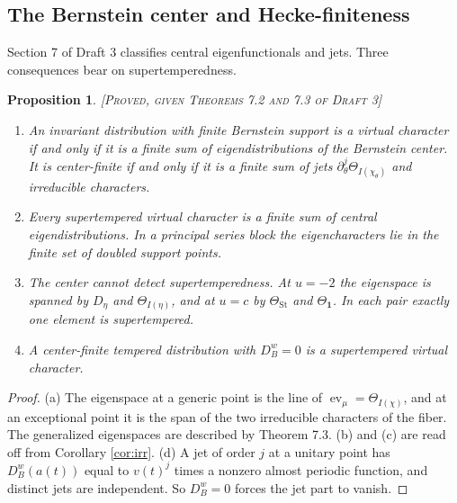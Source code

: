 \documentclass[12pt,letterpaper]{amsart}
\numberwithin{equation}{section}
\newtheorem{proposition}[theorem]{Proposition}
\theoremstyle{definition}
\theoremstyle{remark}
\newcommand{\St}{\mathrm{St}}
\newcommand{\triv}{\mathbf 1}
\newcommand{\ev}{\operatorname{ev}}
\newcommand{\status}[1]{\textup{[\textsc{#1}]}}
\begin{document}
\subsection{The Bernstein center and Hecke-finiteness}\label{sub:center}
Section 7 of Draft 3 classifies central eigenfunctionals and jets. Three consequences bear on supertemperedness.

\begin{proposition}\label{prop:center}\status{Proved, given Theorems 7.2 and 7.3 of Draft 3}
\begin{enumerate}[label=(\alph*),leftmargin=*]
\item An invariant distribution with finite Bernstein support is a virtual character if and only if it is a finite sum of eigendistributions of the Bernstein center. It is center-finite if and only if it is a finite sum of jets $\partial_\theta^j\Theta_{I(\chi_\theta)}$ and irreducible characters.
\item Every supertempered virtual character is a finite sum of central eigendistributions. In a principal series block the eigencharacters lie in the finite set of doubled support points.
\item The center cannot detect supertemperedness. At $u=-2$ the eigenspace is spanned by $D_\eta$ and $\Theta_{I(\eta)}$, and at $u=c$ by $\Theta_{\St}$ and $\Theta_{\triv}$. In each pair exactly one element is supertempered.
\item A center-finite tempered distribution with $D^w_B=0$ is a supertempered virtual character.
\end{enumerate}
\end{proposition}
\begin{proof}
(a) The eigenspace at a generic point is the line of $\ev_\mu=\Theta_{I(\chi)}$, and at an exceptional point it is the span of the two irreducible characters of the fiber. The generalized eigenspaces are described by Theorem 7.3. (b) and (c) are read off from Corollary \ref{cor:irr}. (d) A jet of order $j$ at a unitary point has $D^w_B(a(t))$ equal to $v(t)^j$ times a nonzero almost periodic function, and distinct jets are independent. So $D^w_B=0$ forces the jet part to vanish.
\end{proof}
\end{document}
